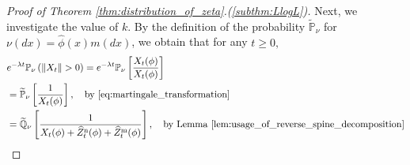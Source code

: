\documentclass[12pt,a4paper]{amsart}
\numberwithin{equation}{section}
\theoremstyle{plain}
\theoremstyle{definition}
\begin{document}
\begin{proof}[Proof of Theorem \ref{thm:distribution_of_zeta}.(\ref{subthm:LlogL})]
	Next, we investigate the value of $k$.  By the definition of the probability $\widetilde{\mathbb P}_\nu$ for $\nu(dx)=\widehat\phi(x)m(dx)$, we obtain that for any $t\ge 0,$
  \begin{align}\label{eq:subcritical_equality}
    &e^{-\lambda t}\mathbb P_\nu\left( \left\| X_t \right\| >0 \right) 
    = e^{-\lambda t}\mathbb P_\nu\left[ \frac{X_t(\phi)}{X_t(\phi)}\right] 
    \\ &= \widetilde {\mathbb P}_\nu\left[ \frac{1}{X_t(\phi)} \right],\quad\text{by~\eqref{eq:martingale_transformation}}
    \\ &= \widetilde {\mathbb Q}_\nu \left[ \frac{1}{X_t(\phi)+\widehat Z_t^{\mathrm n}(\phi) + \widehat Z_t^{\mathrm m}(\phi)} \right],\quad\text{by~Lemma \ref{lem:usage_of_reverse_spine_decomposition}}  
\end{align}


\end{proof}
\end{document}
